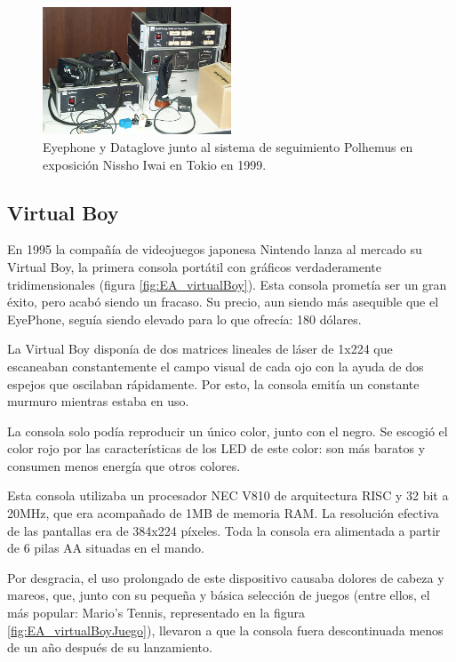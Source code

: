 \begin{figure}[H]
  \centering
\includegraphics[width=0.5\textwidth]{03.EstudioProblema/01.EstadoArte/00.Figuras/17.eyephone_dataglove.jpg}
    \caption{Eyephone y Dataglove junto al sistema de seguimiento Polhemus en exposición Nissho Iwai en Tokio en 1999. \cite{EA_img_eyePhone}}
    \label{fig:EA_eyePhone}
\end{figure}


\subsection{Virtual Boy}

En 1995 la compañía de videojuegos japonesa Nintendo lanza al mercado su Virtual Boy, la primera consola portátil con gráficos verdaderamente tridimensionales (figura \ref{fig:EA_virtualBoy}). Esta consola prometía ser un gran éxito, pero acabó siendo un fracaso. Su precio, aun siendo más asequible que el EyePhone, seguía siendo elevado para lo que ofrecía: 180 dólares.

La Virtual Boy disponía de dos matrices lineales de láser de 1x224 que escaneaban constantemente el campo visual de cada ojo con la ayuda de dos espejos que oscilaban rápidamente. Por esto, la consola emitía un constante murmuro mientras estaba en uso.

La consola solo podía reproducir un único color, junto con el negro. Se escogió el color rojo por las características de los LED de este color: son más baratos y consumen menos energía que otros colores.

Esta consola utilizaba un procesador NEC V810 de arquitectura RISC y 32 bit a 20MHz, que era acompañado de 1MB de memoria RAM. La resolución efectiva de las pantallas era de 384x224 píxeles. Toda la consola era alimentada a partir de 6 pilas AA situadas en el mando.

Por desgracia, el uso prolongado de este dispositivo causaba dolores de cabeza y mareos, que, junto con su pequeña y básica selección de juegos (entre ellos, el más popular: Mario's Tennis, representado en la figura \ref{fig:EA_virtualBoyJuego}), llevaron a que la consola fuera descontinuada menos de un año después de su lanzamiento.




